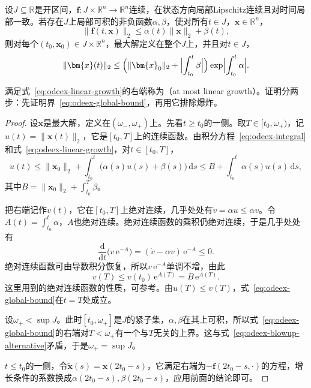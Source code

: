 \begin{theorem}[线性增长下的全局存在]
\label{thm:odeex-global}
设$J\subseteq\mathbb{R}$是开区间，$\bm{f}:J\times\mathbb{R}^{n}\to\mathbb{R}^{n}$连续，在状态方向局部Lipschitz连续且对时间局部一致。若存在$J$上局部可积的非负函数$\alpha,\beta$，使对所有$t\in J$，$\bm{x}\in\mathbb{R}^{n}$，
\begin{equation}
 \lVert\bm{f}(t,\bm{x})\rVert_2\leq\alpha(t)\lVert\bm{x}\rVert_2+\beta(t),
 \label{eq:odeex-linear-growth}
\end{equation}
则对每个$(t_0,\bm{x}_0)\in J\times\mathbb{R}^{n}$，最大解定义在整个$J$上，并且对$t\in J$，
\begin{equation}
 \lVert\bm{x}(t)\rVert_2\leq\Bigl(\lVert\bm{x}_0\rVert_2+\Bigl\lvert\int_{t_0}^{t}\beta\Bigr\rvert\Bigr)\exp\Bigl\lvert\int_{t_0}^{t}\alpha\Bigr\rvert.
 \label{eq:odeex-global-bound}
\end{equation}
\end{theorem}

满足式~\eqref{eq:odeex-linear-growth}的右端称为（at most linear growth）。证明分两步：先证明界~\eqref{eq:odeex-global-bound}，再用它排除爆炸。

\begin{proof}
设$\bm{x}$是最大解，定义在$(\omega_-,\omega_+)$上。先看$t\geq t_0$的一侧。取$T\in[t_0,\omega_+)$，记$u(t)=\lVert\bm{x}(t)\rVert_2$，它是$[t_0,T]$上的连续函数。由积分方程~\eqref{eq:odeex-integral}和式~\eqref{eq:odeex-linear-growth}，对$t\in[t_0,T]$，
\[
 u(t)\leq\lVert\bm{x}_0\rVert_2+\int_{t_0}^{t}\bigl(\alpha(s)u(s)+\beta(s)\bigr)\,\mathrm{d}s\leq B+\int_{t_0}^{t}\alpha(s)u(s)\,\mathrm{d}s,
\]
其中$B=\lVert\bm{x}_0\rVert_2+\int_{t_0}^{T}\beta$。

把右端记作$v(t)$，它在$[t_0,T]$上绝对连续，几乎处处有$\dot v=\alpha u\leq\alpha v$。令$A(t)=\int_{t_0}^t\alpha$，$A$也绝对连续。绝对连续函数的乘积仍绝对连续，于是几乎处处有
\[
 \frac{\mathrm{d}}{\mathrm{d}t}\bigl(v\,\mathrm{e}^{-A}\bigr)=(\dot v-\alpha v)\,\mathrm{e}^{-A}\leq0.
\]
绝对连续函数可由导数积分恢复，所以$v\,\mathrm{e}^{-A}$单调不增，由此
\[
 v(T)\leq v(t_0)\,\mathrm{e}^{A(T)}=B\,\mathrm{e}^{A(T)}.
\]
这里用到的绝对连续函数的性质，可参考。由$u(T)\leq v(T)$，式~\eqref{eq:odeex-global-bound}在$t=T$处成立。

设$\omega_+<\sup J$。此时$[t_0,\omega_+]$是$J$的紧子集，$\alpha,\beta$在其上可积，所以式~\eqref{eq:odeex-global-bound}的右端对$T<\omega_+$有一个与$T$无关的上界。这与式~\eqref{eq:odeex-blowup-alternative}矛盾，于是$\omega_+=\sup J$。

$t\leq t_0$的一侧，令$\tilde{\bm{x}}(s)=\bm{x}(2t_0-s)$，它满足右端为$-\bm{f}(2t_0-s,\cdot)$的方程，增长条件的系数换成$\alpha(2t_0-s),\beta(2t_0-s)$，应用前面的结论即可。
\end{proof}

